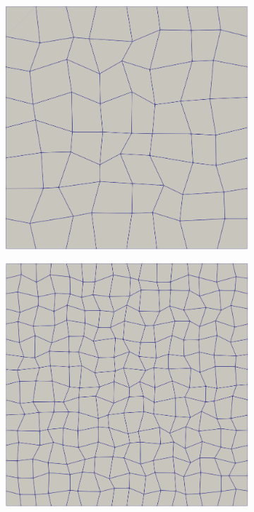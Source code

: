 \documentclass{ansarticle-preprint}
\begin{document}
\begin{figure}
  \centering
  \begin{subfigure}[b]{0.28\textwidth}
    \centering
    \includegraphics[width=\textwidth]{png/mesh_0.png}
  \end{subfigure}
  \hfill
  \begin{subfigure}[b]{0.28\textwidth}
    \centering
    \includegraphics[width=\textwidth]{png/mesh_1.png}

\end{subfigure}
\end{figure}
\end{document}
